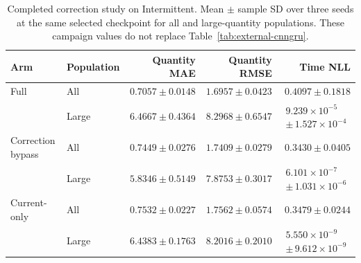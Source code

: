 \documentclass[runningheads]{llncs}
\begin{document}
\begin{table}[htbp]
\caption{Completed correction study on Intermittent. Mean $\pm$ sample SD over three seeds at the same selected checkpoint for all and large-quantity populations. These campaign values do not replace Table~\ref{tab:external-cnngru}.}
\label{tab:history-six-intermittent_frozen_5000}
\centering\small
\setlength{\tabcolsep}{3pt}
\renewcommand{\arraystretch}{1.12}
\begin{tabular}{@{}llrrr@{}}
\toprule
Arm & Population & Quantity MAE & Quantity RMSE & Time NLL\\
\midrule
Full & All & $0.7057\pm0.0148$ & $1.6957\pm0.0423$ & $0.4097\pm0.1818$\\
 & Large & $6.4667\pm0.4364$ & $8.2968\pm0.6547$ & $\begin{gathered}9.239\!\times\!10^{-5}\\{\scriptstyle\pm\,1.527\!\times\!10^{-4}}\end{gathered}$\\
\midrule
Correction bypass & All & $0.7449\pm0.0276$ & $1.7409\pm0.0279$ & $0.3430\pm0.0405$\\
 & Large & $5.8346\pm0.5149$ & $7.8753\pm0.3017$ & $\begin{gathered}6.101\!\times\!10^{-7}\\{\scriptstyle\pm\,1.031\!\times\!10^{-6}}\end{gathered}$\\
\midrule
Current-only & All & $0.7532\pm0.0227$ & $1.7562\pm0.0574$ & $0.3479\pm0.0244$\\
 & Large & $6.4383\pm0.1763$ & $8.2016\pm0.2010$ & $\begin{gathered}5.550\!\times\!10^{-9}\\{\scriptstyle\pm\,9.612\!\times\!10^{-9}}\end{gathered}$\\
\bottomrule
\end{tabular}
\end{table}
\end{document}
